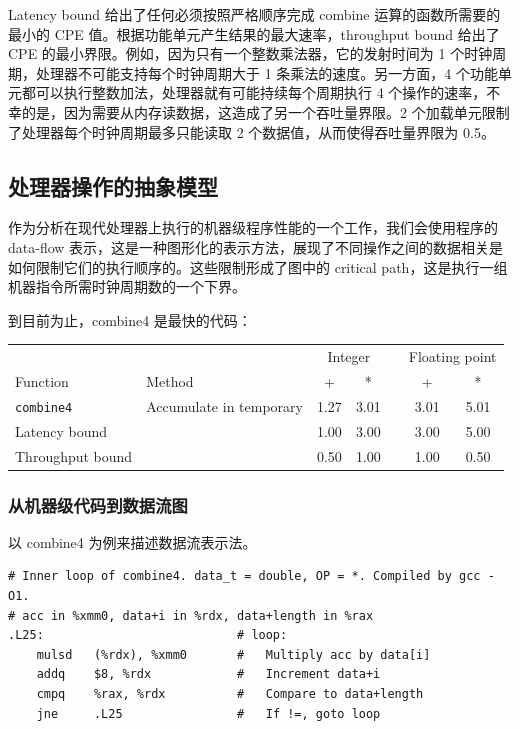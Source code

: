 Latency bound 给出了任何必须按照严格顺序完成 combine 运算的函数所需要的最小的 CPE 值。根据功能单元产生结果的最大速率，throughput bound 给出了 CPE 的最小界限。例如，因为只有一个整数乘法器，它的发射时间为 1 个时钟周期，处理器不可能支持每个时钟周期大于 1 条乘法的速度。另一方面，4 个功能单元都可以执行整数加法，处理器就有可能持续每个周期执行 4 个操作的速率，不幸的是，因为需要从内存读数据，这造成了另一个吞吐量界限。2 个加载单元限制了处理器每个时钟周期最多只能读取 2 个数据值，从而使得吞吐量界限为 0.5。

\subsection{处理器操作的抽象模型}

作为分析在现代处理器上执行的机器级程序性能的一个工作，我们会使用程序的 data-flow 表示，这是一种图形化的表示方法，展现了不同操作之间的数据相关是如何限制它们的执行顺序的。这些限制形成了图中的 critical path，这是执行一组机器指令所需时钟周期数的一个下界。

到目前为止，combine4 是最快的代码：

\begin{table}[!ht]
    \centering
    \begin{tabular}{llccccc}
        \toprule
        & & \multicolumn{2}{c}{Integer} & & \multicolumn{2}{c}{Floating point} \\
        \cmidrule{3-4} \cmidrule{6-7}
        Function & Method & + & * & & + & * \\
        \midrule
        \texttt{combine4} & Accumulate in temporary & 1.27 & 3.01 & & 3.01 & 5.01 \\
        Latency bound & & 1.00 & 3.00 & & 3.00 & 5.00 \\
        Throughput bound & & 0.50 & 1.00 & & 1.00 & 0.50 \\
        \bottomrule
    \end{tabular}
\end{table}

\subsubsection{从机器级代码到数据流图}

以 combine4 为例来描述数据流表示法。

\begin{verbatim}
# Inner loop of combine4. data_t = double, OP = *. Compiled by gcc -O1.
# acc in %xmm0, data+i in %rdx, data+length in %rax
.L25:                           # loop:
    mulsd   (%rdx), %xmm0       #   Multiply acc by data[i]
    addq    $8, %rdx            #   Increment data+i
    cmpq    %rax, %rdx          #   Compare to data+length
    jne     .L25                #   If !=, goto loop
\end{verbatim}

